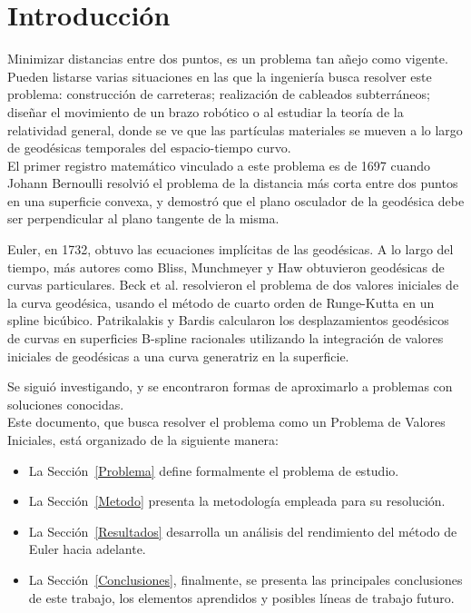 \documentclass{endm}
\begin{document}
%
\section{Introducci\'on}\label{intro}
\tab Minimizar distancias entre dos puntos, es un problema tan añejo como vigente. Pueden listarse varias situaciones en las que la ingenier\'ia busca resolver este problema: construcci\'on de carreteras; realizaci\'on de cableados subterr\'aneos; diseñar el movimiento de un brazo rob\'otico o al estudiar la teor\'ia de la relatividad general, donde se ve que las part\'iculas materiales se mueven a lo largo de geod\'esicas temporales del espacio-tiempo curvo. \\

El primer registro matem\'atico vinculado a este problema es de 1697 cuando Johann Bernoulli resolvi\'o  el problema de la distancia m\'as corta entre dos puntos en una superficie convexa, y demostr\'o que el plano osculador de la geod\'esica debe ser perpendicular al plano tangente de la misma.

Euler, en 1732, obtuvo las ecuaciones impl\'icitas de las geod\'esicas. 
A lo largo del tiempo, m\'as autores como Bliss, Munchmeyer y Haw obtuvieron geod\'esicas de curvas particulares. Beck et al. resolvieron el problema de dos valores iniciales de la curva geod\'esica, usando el m\'etodo de cuarto orden de Runge-Kutta en un spline bic\'ubico. Patrikalakis y Bardis calcularon los desplazamientos geod\'esicos de curvas en superficies B-spline racionales utilizando la integraci\'on de valores iniciales de geod\'esicas a una curva generatriz  en la superficie.

Se sigui\'o investigando, y se encontraron formas de aproximarlo a problemas con soluciones conocidas.\\ 

Este documento, que busca resolver el problema como un Problema de Valores Iniciales,  est\'a organizado de la siguiente manera:
\begin{itemize}
\item La Secci\'on~\ref{Problema} define formalmente el problema de estudio.
\item La Secci\'on~\ref{Metodo} presenta la metodolog\'ia empleada para su resoluci\'on.
\item La Secci\'on~\ref{Resultados} desarrolla un an\'alisis del rendimiento del m\'etodo de Euler hacia adelante.
\item La Secci\'on~\ref{Conclusiones}, finalmente, se presenta las principales conclusiones de este trabajo, los elementos aprendidos y posibles l\'ineas de trabajo futuro.
\end{itemize}
\end{document}
